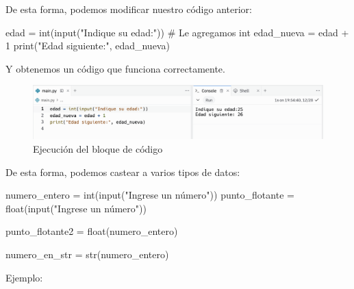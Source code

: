 \documentclass[
  letterpaper,
  DIV=11,
  numbers=noendperiod]{scrreprt}
\newenvironment{Shaded}{\begin{snugshade}}{\end{snugshade}}
\newcommand{\BuiltInTok}[1]{\textcolor[rgb]{0.00,0.23,0.31}{#1}}
\newcommand{\CommentTok}[1]{\textcolor[rgb]{0.37,0.37,0.37}{#1}}
\newcommand{\DecValTok}[1]{\textcolor[rgb]{0.68,0.00,0.00}{#1}}
\newcommand{\NormalTok}[1]{\textcolor[rgb]{0.00,0.23,0.31}{#1}}
\newcommand{\OperatorTok}[1]{\textcolor[rgb]{0.37,0.37,0.37}{#1}}
\newcommand{\StringTok}[1]{\textcolor[rgb]{0.13,0.47,0.30}{#1}}
\begin{document}
De esta forma, podemos modificar nuestro código anterior:

\begin{Shaded}
\begin{Highlighting}[]
\NormalTok{edad }\OperatorTok{=} \BuiltInTok{int}\NormalTok{(}\BuiltInTok{input}\NormalTok{(}\StringTok{"Indique su edad:"}\NormalTok{)) }\CommentTok{\# Le agregamos int}
\NormalTok{edad\_nueva }\OperatorTok{=}\NormalTok{ edad }\OperatorTok{+} \DecValTok{1}
\BuiltInTok{print}\NormalTok{(}\StringTok{"Edad siguiente:"}\NormalTok{, edad\_nueva)}
\end{Highlighting}
\end{Shaded}

Y obtenemos un código que funciona correctamente.

\begin{figure}

{\centering \includegraphics{./imgs/unidad_2/error_input2.png}

}

\caption{Ejecución del bloque de código}

\end{figure}

De esta forma, podemos castear a varios tipos de datos:

\begin{Shaded}
\begin{Highlighting}[]
\NormalTok{numero\_entero }\OperatorTok{=} \BuiltInTok{int}\NormalTok{(}\BuiltInTok{input}\NormalTok{(}\StringTok{"Ingrese un número"}\NormalTok{))}
\NormalTok{punto\_flotante }\OperatorTok{=} \BuiltInTok{float}\NormalTok{(}\BuiltInTok{input}\NormalTok{(}\StringTok{"Ingrese un número"}\NormalTok{))}

\NormalTok{punto\_flotante2 }\OperatorTok{=} \BuiltInTok{float}\NormalTok{(numero\_entero)}

\NormalTok{numero\_en\_str }\OperatorTok{=} \BuiltInTok{str}\NormalTok{(numero\_entero)}
\end{Highlighting}
\end{Shaded}

Ejemplo:
\end{document}
